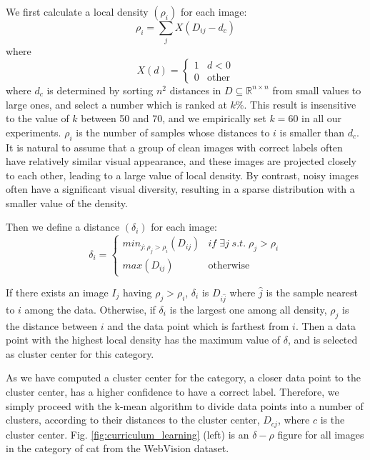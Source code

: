 \documentclass[runningheads]{llncs}
\begin{document}
We first calculate a local density $(\rho_i)$ for each image:
\begin{equation}
\rho_i=\sum_{j}X(D_{ij}-d_c)
\end{equation}
where
$$X(d)=
\begin{cases}
1& d<0\\
0& \text{other}
\end{cases}$$
where $d_c$ is determined by sorting $n^2$ distances in $D \subseteq \mathbb{R}^{n\times n}$ from small values to large ones, and select a number which is ranked at $k\%$. This result is insensitive to the value of $k$ between 50 and 70, and we empirically set $k=60$ in all our experiments. $\rho_i$ is the number of samples whose distances to $i$ is smaller than $d_c$. It is natural to assume that a group of clean images with correct labels often have relatively similar visual appearance, and these images are projected closely to each other, leading to a large value of local density. By contrast, noisy images often have a significant visual diversity, resulting in a sparse distribution with a smaller value of the density.

Then we define a distance $(\delta_i)$ for each image:
\begin{equation}
\delta_i=
\begin{cases}
min_{j:\rho_j>\rho_i}(D_{ij})& if \; \exists j \; s.t. \; \rho_j>\rho_i \\
max(D_{ij}) & \text{otherwise}
\end{cases}
\end{equation}

If there exists an image $I_j$ having $ \rho_j>\rho_i$, $\delta_i$ is $D_{i\hat{j}}$ where $\hat{j}$ is the sample nearest to $i$ among the data. Otherwise, if $\delta_i$ is the largest one among all density, $\rho_j$ is the distance between $i$ and the data point which is farthest from $i$. Then a data point with the highest local density has the maximum value of $\delta$, and is selected as cluster center for this category.


As we have computed a cluster center for the category, a closer data point to the cluster center, has a higher confidence to have a correct label.
Therefore, we simply proceed with the k-mean algorithm to divide data points into a number of clusters, according to their distances to the cluster center, $D_{cj}$, where $c$ is the cluster center. Fig. \ref{fig:curriculum_learning} (left) is an $\delta- \rho$ figure for all images in the category of cat from the WebVision dataset.
\end{document}
